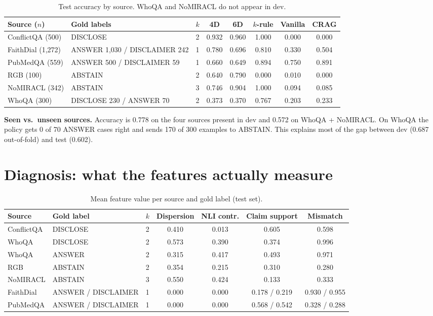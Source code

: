 \documentclass[10pt,a4paper]{article}
\begin{document}
\begin{table}[h]
\centering\small
\caption{Test accuracy by source. WhoQA and NoMIRACL do not appear in dev.}
\begin{tabular}{llcccccc}
\toprule
Source ($n$) & Gold labels & $k$ & 4D & 6D & $k$-rule & Vanilla & CRAG \\
\midrule
ConflictQA (500) & DISCLOSE & 2 & 0.932 & 0.960 & 1.000 & 0.000 & 0.000 \\
FaithDial (1{,}272) & ANSWER 1{,}030 / DISCLAIMER 242 & 1 & 0.780 & 0.696 & 0.810 & 0.330 & 0.504 \\
PubMedQA (559) & ANSWER 500 / DISCLAIMER 59 & 1 & 0.660 & 0.649 & 0.894 & 0.750 & 0.891 \\
RGB (100) & ABSTAIN & 2 & 0.640 & 0.790 & 0.000 & 0.010 & 0.000 \\
\midrule
NoMIRACL (342) & ABSTAIN & 3 & 0.746 & 0.904 & 1.000 & 0.094 & 0.085 \\
WhoQA (300) & DISCLOSE 230 / ANSWER 70 & 2 & 0.373 & 0.370 & 0.767 & 0.203 & 0.233 \\
\bottomrule
\end{tabular}
\end{table}

\textbf{Seen vs.\ unseen sources.} Accuracy is 0.778 on the four sources present in dev and 0.572
on WhoQA + NoMIRACL. On WhoQA the policy gets 0 of 70 ANSWER cases right and sends 170 of 300
examples to ABSTAIN. This explains most of the gap between dev (0.687 out-of-fold) and test (0.602).

\section{Diagnosis: what the features actually measure}

\begin{table}[h]
\centering\small
\caption{Mean feature value per source and gold label (test set).}
\begin{tabular}{llccccc}
\toprule
Source & Gold label & $k$ & Dispersion & NLI contr. & Claim support & Mismatch \\
\midrule
ConflictQA & DISCLOSE & 2 & 0.410 & 0.013 & 0.605 & 0.598 \\
WhoQA & DISCLOSE & 2 & 0.573 & 0.390 & 0.374 & 0.996 \\
WhoQA & ANSWER & 2 & 0.315 & 0.417 & 0.493 & 0.971 \\
RGB & ABSTAIN & 2 & 0.354 & 0.215 & 0.310 & 0.280 \\
NoMIRACL & ABSTAIN & 3 & 0.550 & 0.424 & 0.133 & 0.333 \\
FaithDial & ANSWER / DISCLAIMER & 1 & 0.000 & 0.000 & 0.178 / 0.219 & 0.930 / 0.955 \\
PubMedQA & ANSWER / DISCLAIMER & 1 & 0.000 & 0.000 & 0.568 / 0.542 & 0.328 / 0.288 \\
\bottomrule
\end{tabular}
\end{table}
\end{document}
